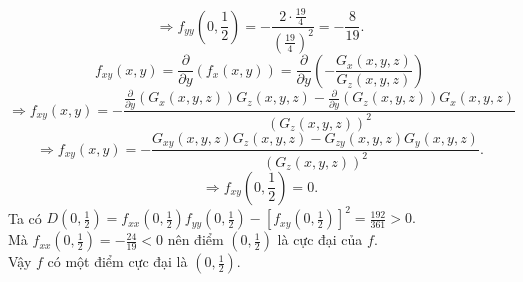 \documentclass[12pt,a4paper]{article}
\begin{document}
\[ \Rightarrow {f_{yy}}\left( {0,\frac{1}{2}} \right) =  - \frac{{2 \cdot \frac{{19}}{4}}}{{{{\left( {\frac{{19}}{4}} \right)}^2}}} =  - \frac{8}{{19}}.\]
\[{f_{xy}}\left( {x,y} \right) = \frac{\partial }{{\partial y}}\left( {{f_x}\left( {x,y} \right)} \right) = \frac{\partial }{{\partial y}}\left( { - \frac{{{G_x}\left( {x,y,z} \right)}}{{{G_z}\left( {x,y,z} \right)}}} \right)\]
\[ \Rightarrow {f_{xy}}\left( {x,y} \right) =  - \frac{{\frac{\partial }{{\partial y}}\left( {{G_x}\left( {x,y,z} \right)} \right){G_z}\left( {x,y,z} \right) - \frac{\partial }{{\partial y}}\left( {{G_z}\left( {x,y,z} \right)} \right){G_x}\left( {x,y,z} \right)}}{{{{\left( {{G_z}\left( {x,y,z} \right)} \right)}^2}}}\]
\[ \Rightarrow {f_{xy}}\left( {x,y} \right) =  - \frac{{{G_{xy}}\left( {x,y,z} \right){G_z}\left( {x,y,z} \right) - {G_{zy}}\left( {x,y,z} \right){G_y}\left( {x,y,z} \right)}}{{{{\left( {{G_z}\left( {x,y,z} \right)} \right)}^2}}}.\]
\[ \Rightarrow {f_{xy}}\left( {0,\frac{1}{2}} \right) = 0.\]
Ta có \(D\left( {0,\frac{1}{2}} \right) = {f_{xx}}\left( {0,\frac{1}{2}} \right){f_{yy}}\left( {0,\frac{1}{2}} \right) - {\left[ {{f_{xy}}\left( {0,\frac{1}{2}} \right)} \right]^2} = \frac{{192}}{{361}} > 0.\) \\
Mà \({f_{xx}}\left( {0,\frac{1}{2}} \right) =  - \frac{{24}}{{19}} < 0\) nên điểm \(\left( {0,\frac{1}{2}} \right)\) là cực đại của \(f.\)\\
Vậy \(f\) có một điểm cực đại là \(\left( {0,\frac{1}{2}} \right).\)
\end{document}
